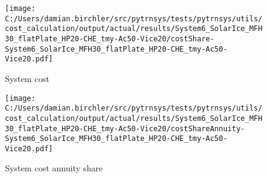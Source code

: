 \documentclass[english]{SPFShortReport}
\begin{document}
\begin{figure}[!htbp]
\begin{center}
\texttt{[image: C:/Users/damian.birchler/src/pytrnsys/tests/pytrnsys/utils/cost\_calculation/output/actual/results/System6\_SolarIce\_MFH30\_flatPlate\_HP20-CHE\_tmy-Ac50-Vice20/costShare-System6\_SolarIce\_MFH30\_flatPlate\_HP20-CHE\_tmy-Ac50-Vice20.pdf]}
\caption{System cost}
\label{systemCost}
\end{center}
\end{figure}
\begin{figure}[!htbp]
\begin{center}
\texttt{[image: C:/Users/damian.birchler/src/pytrnsys/tests/pytrnsys/utils/cost\_calculation/output/actual/results/System6\_SolarIce\_MFH30\_flatPlate\_HP20-CHE\_tmy-Ac50-Vice20/costShareAnnuity-System6\_SolarIce\_MFH30\_flatPlate\_HP20-CHE\_tmy-Ac50-Vice20.pdf]}
\caption{System cost annuity share}
\label{systemCostannuity}
\end{center}
\end{figure}
\end{document}
